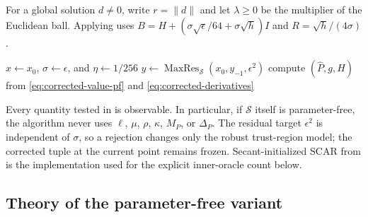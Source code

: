 \documentclass{article}
\begin{document}
For a global solution $d\ne0$, write $r=\|d\|$ and let $\lambda\ge0$
be the multiplier of the Euclidean ball.  Applying
 uses
$B=H+(\sigma\sqrt\epsilon/64+\sigma\sqrt h)I$ and
$R=\sqrt h/(4\sigma)$.

\begin{algorithm}[H]
\DontPrintSemicolon
\caption{Asymptotically parameter-free outer residual-module UTR}
\label{alg:pf-residual-utr}
$x\leftarrow x_0$, $\sigma\leftarrow\epsilon$, and
$\eta\leftarrow1/256$\;
$y\leftarrow
 \operatorname{MaxRes}_{\mathcal S}(x_0,y_{-1},\epsilon^2)$\;
compute $(\widehat P,g,H)$ from
\eqref{eq:corrected-value-pf} and \eqref{eq:corrected-derivatives}\;
\end{algorithm}

Every quantity tested in  is observable.  In
particular, if $\mathcal S$ itself is parameter-free, the algorithm
never uses $\ell$, $\mu$, $\rho$, $\kappa$, $M_P$, or $\Delta_P$.
The residual target $\epsilon^2$ is independent of $\sigma$, so a
rejection changes only the robust trust-region model; the corrected
tuple at the current point remains frozen.  Secant-initialized SCAR from
 is the implementation used for the explicit
inner-oracle count below.

\subsection{Theory of the parameter-free variant}
\end{document}
